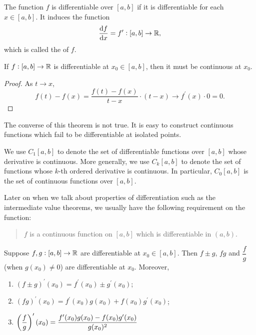 The function $f$ is differentiable over $[a,b]$ if it is differentiable for each $x\in[a,b]$. It induces the function
\[ \dv{f}{x}=f^\prime:[a,b]\to\mathbb R, \]
which is called the  of $f$.

\begin{theorem}\label{thrm:diff-cont}
If $f:[a,b]\to\mathbb R$ is differentiable at $x_0\in[a,b]$, then it must be continuous at $x_0$.
\end{theorem}

\begin{proof}
As $t\to x$,
\[ f(t)-f(x)=\frac{f(t)-f(x)}{t-x}\cdot(t-x)\to f^\prime(x)\cdot0=0. \]
\end{proof}

\begin{remark}
The converse of this theorem is not true. It is easy to construct continuous functions which fail to be differentiable at isolated points.
\end{remark}

\begin{notation}
We use $C_1[a,b]$ to denote the set of differentiable functions over $[a,b]$ whose derivative is continuous. More generally, we use $C_k[a,b]$ to denote the set of functions whose $k$-th ordered derivative is continuous. In particular, $C_0[a,b]$ is the set of continuous functions over $[a,b]$.
\end{notation}

Later on when we talk about properties of differentiation such as the intermediate value theorems, we usually have the following requirement on the function:
\begin{quote}
$f$ is a continuous function on $[a,b]$ which is differentiable in $(a,b)$.
\end{quote}

\begin{theorem}
Suppose $f,g:[a,b]\to\mathbb R$ are differentiable at $x_0\in[a,b]$. Then $f\pm g$, $fg$ and $\dfrac{f}{g}$ (when $g(x_0)\neq0$) are differentiable at $x_0$. Moreover,
\begin{enumerate}
\item $(f\pm g)^\prime(x_0)=f^\prime(x_0)\pm g^\prime(x_0)$;
\item $(fg)^\prime(x_0)=f^\prime(x_0)g(x_0)+f(x_0)g^\prime(x_0)$;
\item $\displaystyle\left(\frac{f}{g}\right)^\prime(x_0)=\frac{f^\prime(x_0)g(x_0)-f(x_0)g^\prime(x_0)}{g(x_0)^2}$
\end{enumerate}
\end{theorem}

